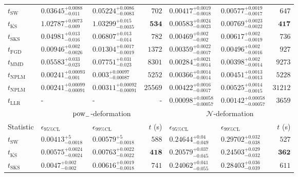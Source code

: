 \begin{tabular}{l|llr|llr}
	\midrule
	$t_{\mathrm{SW}}$ & $0.03645_{-0.011}^{+0.0088}$ & $0.05224_{-0.0083}^{+0.0086}$ & $702$ & $0.00417_{-0.0018}^{+0.0019}$ & $0.00577_{-0.0017}^{+0.0019}$ & $647$ \\
	$t_{\overline{\mathrm{KS}}}$ & $1.02787_{-0.009}^{+0.0073}$ & $1.03299_{-0.0035}^{+0.015}$ & ${\mathbf{534}}$ & $0.00583_{-0.0023}^{+0.0024}$ & $0.00769_{-0.0022}^{+0.0023}$ & ${\mathbf{417}}$ \\
	$t_{\mathrm{SKS}}$ & $0.04981_{-0.016}^{+0.013}$ & $0.06807_{-0.014}^{+0.013}$ & $782$ & $0.00469_{-0.002}^{+0.002}$ & $0.00617_{-0.0019}^{+0.002}$ & $736$ \\
	$t_{\mathrm{FGD}}$ & ${\mathbf{0.00946_{-0.0026}^{+0.002}}}$ & ${\mathbf{0.01304_{-0.0019}^{+0.0017}}}$ & $1372$ & $0.00359_{-0.0017}^{+0.0022}$ & $0.00496_{-0.0016}^{+0.002}$ & $927$ \\
	$t_{\mathrm{MMD}}$ & $0.05583_{-0.023}^{+0.033}$ & $0.07751_{-0.023}^{+0.031}$ & $8301$ & ${\mathbf{0.00284_{-0.0014}^{+0.0021}}}$ & ${\mathbf{0.00398_{-0.0014}^{+0.002}}}$ & $9273$ \\
\rowcolor{red!35}	$t_{\mathrm{NPLM}}$ & $0.00241_{-0.001}^{+0.00093}$ & $0.003_{-0.00087}^{+0.00097}$ & $5252$ & $0.00366_{-0.0014}^{+0.0014}$ & $0.00451_{-0.0013}^{+0.0013}$ & $5228$ \\
\rowcolor{blue!35}	$t_{\mathrm{NPLM}}$ & $0.00241_{-0.00091}^{+0.00099}$ & $0.00311_{-0.00091}^{+0.00092}$ & $25569$ & $0.00422_{-0.0017}^{+0.0016}$ & $0.00525_{-0.0015}^{+0.0014}$ & $31212$ \\
	$t_{\mathrm{LLR}}$ & - & - & - & $0.00098_{-0.00057}^{+0.00058}$ & $0.00142_{-0.00057}^{+0.00058}$ & $3659$ \\
	\toprule
	\multicolumn{1}{c}{} & \multicolumn{3}{c}{$\rm{pow}_{-}$-deformation} & \multicolumn{3}{c}{$\mathcal{N}$-deformation} \\
	Statistic & $\epsilon_{95\%\mathrm{CL}}$ & $\epsilon_{99\%\mathrm{CL}}$ & $t$ (s) & $\epsilon_{95\%\mathrm{CL}}$ & $\epsilon_{99\%\mathrm{CL}}$ & $t$ (s) \\
	\midrule
	$t_{\mathrm{SW}}$ & $0.00413_{-0.0018}^{+5}$ & $0.00579_{-0.0018}^{+5}$ & $588$ & $0.24644_{-0.049}^{+0.04}$ & $0.29702_{-0.038}^{+0.032}$ & $527$ \\
	$t_{\overline{\mathrm{KS}}}$ & $0.00575_{-0.0024}^{+0.0024}$ & $0.00763_{-0.0022}^{+0.0022}$ & ${\mathbf{418}}$ & $0.20579_{-0.045}^{+0.037}$ & $0.24503_{-0.032}^{+0.029}$ & ${\mathbf{362}}$ \\
	$t_{\mathrm{SKS}}$ & $0.0047_{-0.002}^{+0.002}$ & $0.00616_{-0.0018}^{+0.0019}$ & $741$ & $0.24062_{-0.055}^{+0.041}$ & $0.28403_{-0.039}^{+0.036}$ & $611$ \\

\end{tabular}
